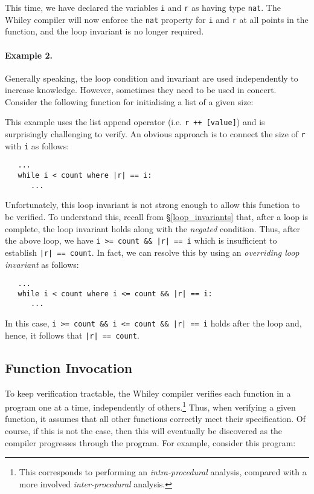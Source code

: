 

This time, we have declared the variables \lstinline{i} and
\lstinline{r} as having type \lstinline{nat}.  The Whiley compiler
will now enforce the \lstinline{nat} property for \lstinline{i} and
\lstinline{r} at all points in the function, and the loop invariant is
no longer required.

\paragraph{Example 2.}  Generally speaking, the loop condition and
invariant are used independently to increase knowledge.  However,
sometimes they need to be used in concert.  Consider the following
function for initialising a list of a given size:



This example uses the list append operator (i.e. \lstinline{r ++ [value]})
 and is surprisingly challenging to verify.  An obvious
approach is to connect the size of \lstinline{r} with \lstinline{i} as
follows:

\begin{lstlisting}
   ...
   while i < count where |r| == i:
      ...
\end{lstlisting}

Unfortunately, this loop invariant is not strong enough to allow this
function to be verified.  To understand this, recall from
\S\ref{loop_invariants} that, after a loop is complete, the loop
invariant holds along with the {\em negated} condition.  Thus, after
the above loop, we have \lstinline{i >= count && |r| == i} which is
insufficient to establish \lstinline{|r| == count}.  In fact, we can
resolve this by using an {\em overriding loop invariant} as follows:

\begin{lstlisting}
   ...
   while i < count where i <= count && |r| == i:
      ...
\end{lstlisting}

In this case, \lstinline{i >= count && i <= count && |r| == i} holds
after the loop and, hence, it follows that \lstinline{|r| == count}.

\subsection{Function Invocation}

To keep verification tractable, the Whiley compiler verifies each
function in a program one at a time, independently of
others.\footnote{This corresponds to performing an {\em
    intra-procedural} analysis, compared with a more involved {\em
    inter-procedural} analysis.}  Thus, when verifying a given
function, it assumes that all other functions correctly meet their
specification.  Of course, if this is not the case, then this will
eventually be discovered as the compiler progresses through the
program.  For example, consider this program:

